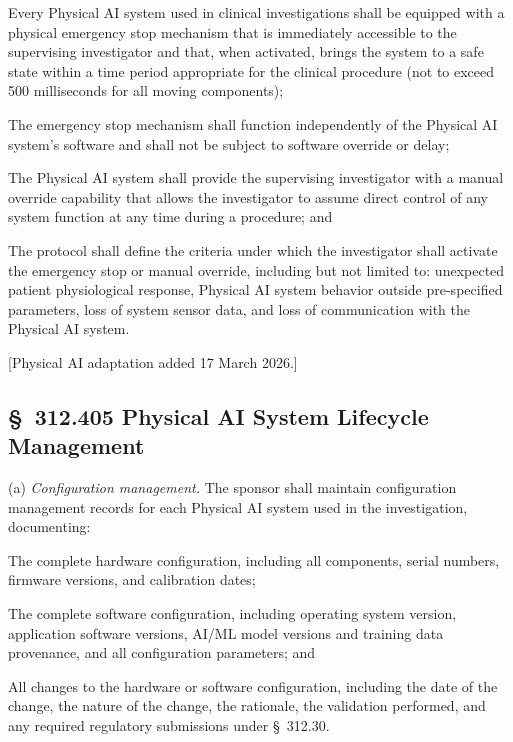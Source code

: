 \begin{description}[leftmargin=0.8cm,style=sameline]
\item[(1)] Every Physical AI system used in clinical investigations shall be equipped with a physical emergency stop mechanism that is immediately accessible to the supervising investigator and that, when activated, brings the system to a safe state within a time period appropriate for the clinical procedure (not to exceed 500 milliseconds for all moving components);
\item[(2)] The emergency stop mechanism shall function independently of the Physical AI system's software and shall not be subject to software override or delay;
\item[(3)] The Physical AI system shall provide the supervising investigator with a manual override capability that allows the investigator to assume direct control of any system function at any time during a procedure; and
\item[(4)] The protocol shall define the criteria under which the investigator shall activate the emergency stop or manual override, including but not limited to: unexpected patient physiological response, Physical AI system behavior outside pre-specified parameters, loss of system sensor data, and loss of communication with the Physical AI system.
\end{description}

[Physical AI adaptation added 17 March 2026.]

\subsection{\S~312.405 Physical AI System Lifecycle Management}

(a) \textit{Configuration management.} The sponsor shall maintain configuration management records for each Physical AI system used in the investigation, documenting:

\begin{description}[leftmargin=0.8cm,style=sameline]
\item[(1)] The complete hardware configuration, including all components, serial numbers, firmware versions, and calibration dates;
\item[(2)] The complete software configuration, including operating system version, application software versions, AI/ML model versions and training data provenance, and all configuration parameters; and
\item[(3)] All changes to the hardware or software configuration, including the date of the change, the nature of the change, the rationale, the validation performed, and any required regulatory submissions under \S~312.30.
\end{description}

